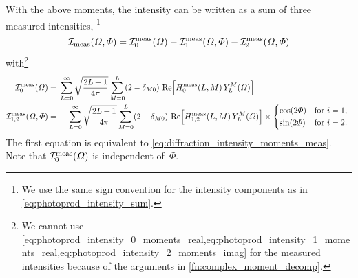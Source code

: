 With the above moments, the intensity can be written as a sum of three
measured intensities, \ie\footnote{We use the same sign convention for
the intensity components as in \cref{eq:photoprod_intensity_sum}.}
\begin{equation}
  \mathcal{I}_\text{meas}(\Omega, \Phi)
  = \mathcal{I}_0^\text{meas}(\Omega) - \mathcal{I}_1^\text{meas}(\Omega, \Phi) - \mathcal{I}_2^\text{meas}(\Omega, \Phi)
\end{equation}
with\footnote{We cannot use
\cref{eq:photoprod_intensity_0_moments_real,eq:photoprod_intensity_1_moments_real,eq:photoprod_intensity_2_moments_imag}
for the measured intensities because of the arguments in
\cref{fn:complex_moment_decomp}.}
\begin{align}
  \intensity_0^\text{meas}(\Omega)
  ={}& \sum_{L = 0}^\infty \sqrt{\frac{2 L + 1}{4 \pi}} \sum_{M = 0}^{L} (2 - \delta_{M 0})\,
  \Re{H_0^\text{meas}(L, M)\, Y_L^M(\Omega)}
  \\
  \intensity_{1, 2}^\text{meas}(\Omega, \Phi)
  ={}& -\sum_{L = 0}^\infty \sqrt{\frac{2 L + 1}{4 \pi}} \sum_{M = 0}^{L} (2 - \delta_{M 0})\,
  \Re{H_{1, 2}^\text{meas}(L, M)\, Y_L^M(\Omega)} \times \begin{cases*}
    \cos(2 \Phi) & for $i = 1$, \\
    \sin(2 \Phi) & for $i = 2$.
  \end{cases*}
\end{align}
The first equation is equivalent to
\cref{eq:diffraction_intensity_moments_meas}.  Note that
$\mathcal{I}_0^\text{meas}(\Omega)$ is independent of~$\Phi$.


